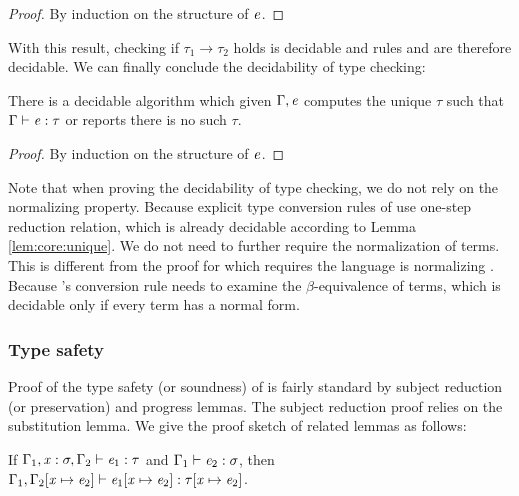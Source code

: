 \begin{proof}
	By induction on the structure of $\mathit{e}$.
\end{proof}

With this result, checking if $\tau_{{\mathrm{1}}}  \longrightarrow  \tau_{{\mathrm{2}}}$ holds is decidable and rules  and  are therefore decidable. We can finally conclude the decidability of type checking:

\begin{lem}\label{lem:core:decide}
	There is a decidable algorithm which given $\Gamma, \mathit{e}$ computes the unique $\tau$ such that $\Gamma  \vdash  \mathit{e}  :  \tau$ or reports there is no such $\tau$.
\end{lem}

\begin{proof}
	By induction on the structure of $\mathit{e}$.
\end{proof}

Note that when proving the decidability of type checking, we do not rely on the normalizing property. Because explicit type conversion rules of \name use one-step reduction relation, which is already decidable according to Lemma \ref{lem:core:unique}. We do not need to further require the normalization of terms. This is different from the proof for \cc which requires the language is normalizing . Because \cc's conversion rule needs to examine the $\beta$-equivalence of terms, which is decidable only if every term has a normal form.

\subsubsection{Type safety}
Proof of the type safety (or soundness) of \name is fairly standard by subject reduction (or preservation) and progress lemmas. The subject reduction proof relies on the substitution lemma. We give the proof sketch of related lemmas as follows:

\begin{lem}\label{lem:subst}
	If $\Gamma_{{\mathrm{1}}}  ,  \mathit{x}  :  \sigma  ,  \Gamma_{{\mathrm{2}}}  \vdash  \mathit{e_{{\mathrm{1}}}}  :  \tau$ and $\Gamma_{{\mathrm{1}}}  \vdash  \mathit{e_{{\mathrm{2}}}}  :  \sigma$, then $\Gamma_{{\mathrm{1}}}  ,  \Gamma_{{\mathrm{2}}}  [  \mathit{x}  \mapsto  \mathit{e_{{\mathrm{2}}}}  ]  \vdash  \mathit{e_{{\mathrm{1}}}}  [  \mathit{x}  \mapsto  \mathit{e_{{\mathrm{2}}}}  ]  :  \tau  [  \mathit{x}  \mapsto  \mathit{e_{{\mathrm{2}}}}  ]$.
\end{lem}

